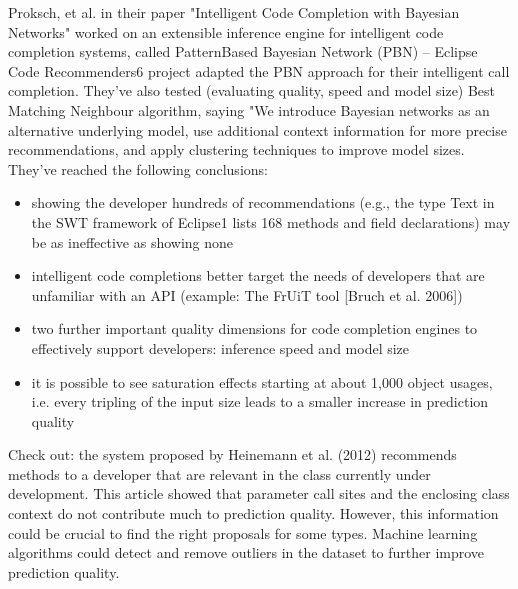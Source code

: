 Proksch, et al. in their paper "Intelligent Code Completion with Bayesian Networks" worked on
an extensible inference engine for intelligent code completion systems, called PatternBased 
Bayesian Network (PBN) -- Eclipse Code Recommenders6 project adapted the PBN approach for their
intelligent call completion. They've also tested (evaluating quality, speed and model size)
Best Matching Neighbour algorithm, saying "We introduce Bayesian networks as an alternative
underlying model, use additional context information for more precise recommendations, and
apply clustering techniques to improve model sizes.
They've reached the following conclusions:
\begin{itemize}
    \item showing the developer hundreds of recommendations (e.g., the type Text in the SWT framework of Eclipse1 lists 168 methods and field declarations) may be as ineffective as showing none
    \item intelligent code completions better target the needs of developers that are unfamiliar with an API (example: The FrUiT tool [Bruch et al. 2006])
    \item two further important quality dimensions for code completion engines to effectively support developers: inference speed and model size
    \item it is possible to see saturation effects starting at about 1,000 object usages, i.e. every tripling of the input size leads to a smaller increase in prediction quality
\end{itemize}
Check out: the system proposed by Heinemann et al. (2012) recommends methods to a developer that are relevant in the class currently under development.
This article showed that parameter call sites and the enclosing class context do not contribute
much to prediction quality. However, this information could be crucial to find the right proposals
for some types. Machine learning algorithms could detect and remove outliers in the dataset
to further improve prediction quality.

